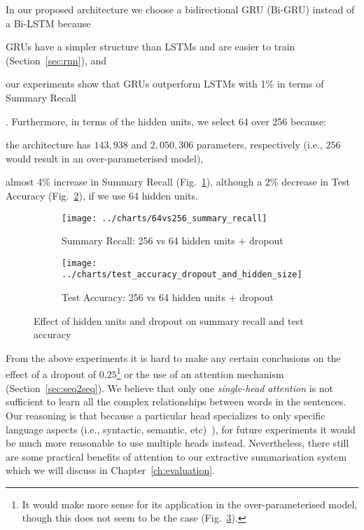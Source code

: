 In our proposed architecture we choose a bidirectional GRU (Bi-GRU) instead of a Bi-LSTM because
\begin{enumerate*}[label=(\alph*)]
    \item GRUs have a simpler structure than LSTMs and are easier to train (Section~\ref{sec:rnn}), and
    \item our experiments show that GRUs outperform LSTMs with 1\% in terms of Summary Recall
\end{enumerate*}.
Furthermore, in terms of the hidden units, we select 64 over 256 because:
\begin{enumerate*}[label=(\alph*)]
    \item the architecture has $143,938$ and $2,050,306$ parameters, respectively (i.e., $256$ would result in an over-parameterised model),
    \item almost 4\% increase in Summary Recall (Fig.~\ref{fig:64vs256_summary_recall}),
    although a 2\% decrease in Test Accuracy (Fig.~\ref{fig:test_accuracy_dropout_and_hidden_size}), if we use $64$ hidden units.
\end{enumerate*}
\begin{figure}[ht]
    \begin{subfigure}{0.49\textwidth}
        \centering \texttt{[image: ../charts/64vs256\_summary\_recall]}
        \caption{Summary Recall: 256 vs 64 hidden units + dropout}
        \label{fig:64vs256_summary_recall}
    \end{subfigure}%
    \hfill
    \begin{subfigure}{0.49\textwidth}
        \centering
        \texttt{[image: ../charts/test\_accuracy\_dropout\_and\_hidden\_size]}
        \caption{Test Accuracy: 256 vs 64 hidden units + dropout}
        \label{fig:test_accuracy_dropout_and_hidden_size}
    \end{subfigure}
    \caption{Effect of hidden units and dropout on summary recall and test accuracy}
    \label{fig:dropout_and_hidden_size}
\end{figure}

From the above experiments it is hard to make any certain conclusions on the effect of a dropout of $0.25$\footnote{
    It would make more sense for its application in the over-parameterised model, though this does not seem to be the case (Fig.~\ref{fig:dropout_and_hidden_size}).
} or the use of an attention mechanism (Section~\ref{sec:seq2seq}).
We believe that only one \emph{single-head attention} is not sufficient to learn all the complex relationships between words in the sentences.
Our reasoning is that because a particular head specializes to only specific language aspects (i.e., syntactic, semantic, etc)~\cite{clark-etal-2019-bert}),
for future experiments it would be much more reasonable to use multiple heads instead.
Nevertheless, there still are some practical benefits of attention to our extractive summarisation system which we will discuss in Chapter~\ref{ch:evaluation}.

